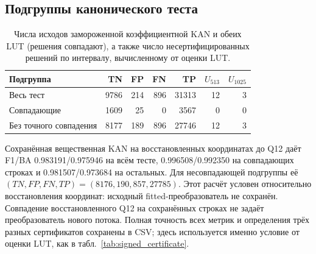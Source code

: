 \subsection{Подгруппы канонического теста}
\label{app:subgroup-details}
\begin{table}[!htbp]
\centering\small
\caption{Числа исходов замороженной коэффициентной KAN и обеих LUT (решения совпадают), а также число несертифицированных решений по интервалу, вычисленному от оценки LUT.}
\label{tab:subgroup-counts}
\begin{tabular}{lrrrrrr}
\toprule
Подгруппа & TN & FP & FN & TP & $U_{513}$ & $U_{1025}$\\
\midrule
Весь тест & 9786 & 214 & 896 & 31313 & 12 & 3\\
Совпадающие & 1609 & 25 & 0 & 3567 & 0 & 0\\
Без точного совпадения & 8177 & 189 & 896 & 27746 & 12 & 3\\
\bottomrule
\end{tabular}
\end{table}
Сохранённая вещественная KAN на восстановленных координатах до Q12 даёт F1/BA 0.983191/0.975946 на всём тесте, 0.996508/0.992350 на совпадающих строках и 0.981507/0.973684 на остальных. Для несовпадающей подгруппы её $(TN,FP,FN,TP)=(8176,190,857,27785)$. Этот расчёт условен относительно восстановления координат: исходный fitted-преобразователь не сохранён. Совпадение восстановленного Q12 на сохранённых строках не задаёт преобразователь нового потока. Полная точность всех метрик и определения трёх разных сертификатов сохранены в CSV; здесь используется именно условие от оценки LUT, как в табл.~\ref{tab:signed_certificate}.
